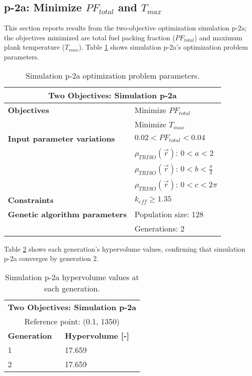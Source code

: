 \subsection{p-2a: Minimize $PF_{total}$ and $T_{max}$}
\label{sec:p-2a}
This section reports results from the two-objective optimization simulation p-2a; the 
objectives minimized are total fuel packing fraction ($PF_{total}$) and maximum plank
temperature ($T_{max}$).  
Table \ref{tab:simulationp2a} shows simulation p-2a's optimization problem parameters.
\begin{table}[htbp!]
    \centering
    \onehalfspacing
    \caption{Simulation p-2a optimization problem parameters.}
	\label{tab:simulationp2a}
    \footnotesize
    \begin{tabular}{l|p{4cm}}
    \hline 
    \multicolumn{2}{c}{\textbf{Two Objectives: Simulation p-2a}} \\
    \hline 
    \textbf{Objectives} & Minimize $PF_{total}$ \\
    & Minimize $T_{max}$ \\
    \hline 
    \textbf{Input parameter variations} & $0.02<PF_{total}<0.04$ \\
    & $\rho_{TRISO}(\vec{r})$: $0<a<2$ \\
    & $\rho_{TRISO}(\vec{r})$: $0<b<\frac{\pi}{2}$ \\
    & $\rho_{TRISO}(\vec{r})$: $0<c<2\pi$ \\
    \hline
    \textbf{Constraints} & $k_{eff} \geq 1.35$\\ 
    \hline 
    \textbf{Genetic algorithm parameters} & Population size: 128 \\
    & Generations: 2 \\
    \hline
    \end{tabular}
\end{table}

Table \ref{tab:p2a-hypervolume} shows each generation's hypervolume values, 
confirming that simulation p-2a converges by generation 2. 
\begin{table}[htbp!]
    \centering
    \onehalfspacing
    \caption{Simulation p-2a hypervolume values at each generation.}
	\label{tab:p2a-hypervolume}
    \footnotesize
    \begin{tabular}{ll}
    \hline 
    \multicolumn{2}{c}{\textbf{Two Objectives: Simulation p-2a}} \\
    \multicolumn{2}{c}{Reference point: (0.1, 1350)} \\
    \hline 
    \textbf{Generation} & \textbf{Hypervolume [-]} \\
    \hline
    1 & 17.659 \\
    2 & 17.659 \\
    \hline
    \end{tabular}
\end{table}

